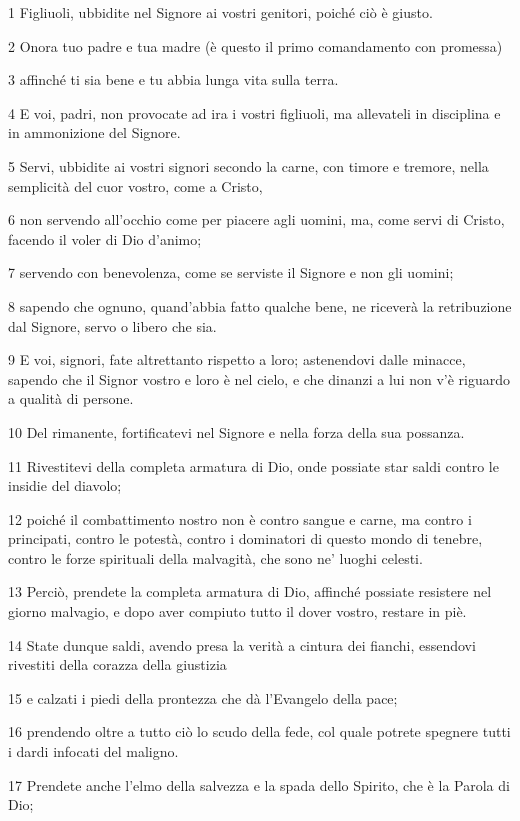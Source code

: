 \par 1 Figliuoli, ubbidite nel Signore ai vostri genitori, poiché ciò è giusto.
\par 2 Onora tuo padre e tua madre (è questo il primo comandamento con promessa)
\par 3 affinché ti sia bene e tu abbia lunga vita sulla terra.
\par 4 E voi, padri, non provocate ad ira i vostri figliuoli, ma allevateli in disciplina e in ammonizione del Signore.
\par 5 Servi, ubbidite ai vostri signori secondo la carne, con timore e tremore, nella semplicità del cuor vostro, come a Cristo,
\par 6 non servendo all'occhio come per piacere agli uomini, ma, come servi di Cristo, facendo il voler di Dio d'animo;
\par 7 servendo con benevolenza, come se serviste il Signore e non gli uomini;
\par 8 sapendo che ognuno, quand'abbia fatto qualche bene, ne riceverà la retribuzione dal Signore, servo o libero che sia.
\par 9 E voi, signori, fate altrettanto rispetto a loro; astenendovi dalle minacce, sapendo che il Signor vostro e loro è nel cielo, e che dinanzi a lui non v'è riguardo a qualità di persone.
\par 10 Del rimanente, fortificatevi nel Signore e nella forza della sua possanza.
\par 11 Rivestitevi della completa armatura di Dio, onde possiate star saldi contro le insidie del diavolo;
\par 12 poiché il combattimento nostro non è contro sangue e carne, ma contro i principati, contro le potestà, contro i dominatori di questo mondo di tenebre, contro le forze spirituali della malvagità, che sono ne' luoghi celesti.
\par 13 Perciò, prendete la completa armatura di Dio, affinché possiate resistere nel giorno malvagio, e dopo aver compiuto tutto il dover vostro, restare in piè.
\par 14 State dunque saldi, avendo presa la verità a cintura dei fianchi, essendovi rivestiti della corazza della giustizia
\par 15 e calzati i piedi della prontezza che dà l'Evangelo della pace;
\par 16 prendendo oltre a tutto ciò lo scudo della fede, col quale potrete spegnere tutti i dardi infocati del maligno.
\par 17 Prendete anche l'elmo della salvezza e la spada dello Spirito, che è la Parola di Dio;
